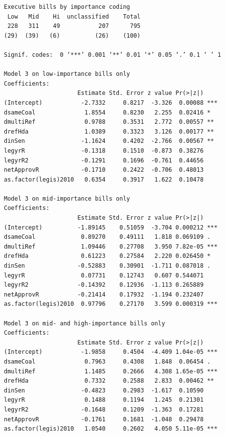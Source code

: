 \documentclass[letter,12pt]{article}
\begin{document}
\begin{table}
\caption{Regressions with rudimentary control for bill importance}
  \begin{singlespacing}
    \begin{footnotesize}
     \begin{verbatim}
Executive bills by importance coding
 Low   Mid    Hi  unclassified    Total
 228   311    49           207      795
(29)  (39)   (6)          (26)    (100)

Signif. codes:  0 ‘***’ 0.001 ‘**’ 0.01 ‘*’ 0.05 ‘.’ 0.1 ‘ ’ 1

Model 3 on low-importance bills only
Coefficients:
                     Estimate Std. Error z value Pr(>|z|)    
(Intercept)           -2.7332     0.8217  -3.326  0.00088 ***
dsameCoal              1.8554     0.8230   2.255  0.02416 *  
dmultiRef              0.9788     0.3531   2.772  0.00557 ** 
drefHda                1.0389     0.3323   3.126  0.00177 ** 
dinSen                -1.1624     0.4202  -2.766  0.00567 ** 
legyrR                -0.1318     0.1510  -0.873  0.38276    
legyrR2               -0.1291     0.1696  -0.761  0.44656    
netApprovR            -0.1710     0.2422  -0.706  0.48013    
as.factor(legis)2010   0.6354     0.3917   1.622  0.10478    

Model 3 on mid-importance bills only
Coefficients:
                     Estimate Std. Error z value Pr(>|z|)    
(Intercept)          -1.89145    0.51059  -3.704 0.000212 ***
dsameCoal             0.89270    0.49111   1.818 0.069109 .  
dmultiRef             1.09446    0.27708   3.950 7.82e-05 ***
drefHda               0.61223    0.27584   2.220 0.026450 *  
dinSen               -0.52883    0.30901  -1.711 0.087018 .  
legyrR                0.07731    0.12743   0.607 0.544071    
legyrR2              -0.14392    0.12936  -1.113 0.265889    
netApprovR           -0.21414    0.17932  -1.194 0.232407    
as.factor(legis)2010  0.97796    0.27170   3.599 0.000319 ***

Model 3 on mid- and high-importance bills only
Coefficients:
                     Estimate Std. Error z value Pr(>|z|)    
(Intercept)           -1.9858     0.4504  -4.409 1.04e-05 ***
dsameCoal              0.7963     0.4308   1.848  0.06454 .  
dmultiRef              1.1485     0.2666   4.308 1.65e-05 ***
drefHda                0.7332     0.2588   2.833  0.00462 ** 
dinSen                -0.4823     0.2983  -1.617  0.10590    
legyrR                 0.1488     0.1194   1.245  0.21301    
legyrR2               -0.1648     0.1209  -1.363  0.17281    
netApprovR            -0.1761     0.1681  -1.048  0.29478    
as.factor(legis)2010   1.0540     0.2602   4.050 5.11e-05 ***
    \end{verbatim}
   \end{footnotesize}
  \end{singlespacing}
\end{table}
\end{document}
